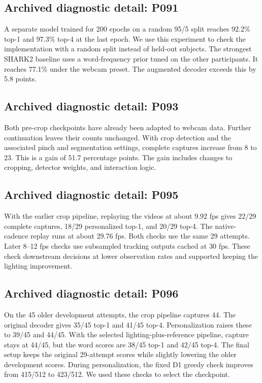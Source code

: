 \subsection*{Archived diagnostic detail: P091}
A separate model trained for 200 epochs on a random 95/5 split reaches 92.2\% top-1 and 97.3\% top-4 at the last epoch. We use this experiment to check the implementation with a random split instead of held-out subjects. The strongest SHARK2 baseline uses a word-frequency prior tuned on the other participants. It reaches 77.1\% under the webcam preset. The augmented decoder exceeds this by 5.8 points.

\subsection*{Archived diagnostic detail: P093}
Both pre-crop checkpoints have already been adapted to webcam data. Further continuation leaves their counts unchanged. With crop detection and the associated pinch and segmentation settings, complete captures increase from 8 to 23. This is a gain of 51.7 percentage points. The gain includes changes to cropping, detector weights, and interaction logic.

\subsection*{Archived diagnostic detail: P095}
With the earlier crop pipeline, replaying the videos at about 9.92 fps gives 22/29 complete captures, 18/29 personalized top-1, and 20/29 top-4. The native-cadence replay runs at about 29.76 fps. Both checks use the same 29 attempts. Later 8--12 fps checks use subsampled tracking outputs cached at 30 fps. These check downstream decisions at lower observation rates and supported keeping the lighting improvement.

\subsection*{Archived diagnostic detail: P096}
On the 45 older development attempts, the crop pipeline captures 44. The original decoder gives 35/45 top-1 and 41/45 top-4. Personalization raises these to 39/45 and 44/45. With the selected lighting-plus-reference pipeline, capture stays at 44/45, but the word scores are 38/45 top-1 and 42/45 top-4. The final setup keeps the original 29-attempt scores while slightly lowering the older development scores. During personalization, the fixed D1 greedy check improves from 415/512 to 423/512. We used these checks to select the checkpoint.

